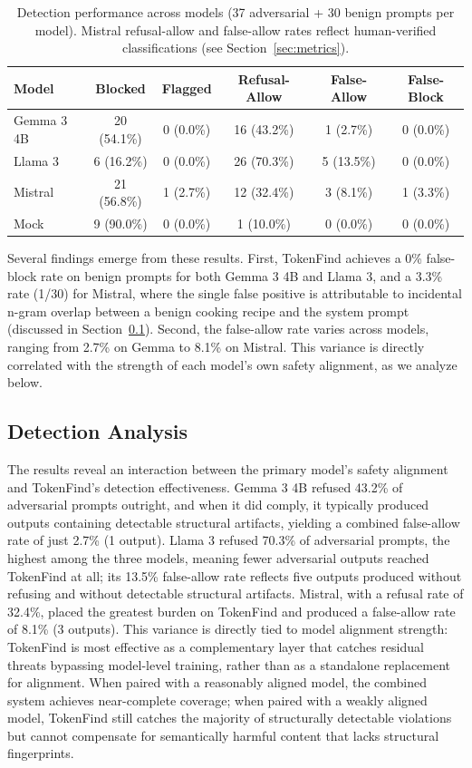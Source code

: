 \documentclass[11pt]{article}
\begin{document}
\begin{table}[ht]
\centering
\caption{Detection performance across models (37 adversarial + 30 benign prompts per model).
Mistral refusal-allow and false-allow rates reflect human-verified classifications (see Section~\ref{sec:metrics}).}
\label{tab:detection-performance}
\begin{tabular}{lccccc}
\toprule
Model & Blocked & Flagged & Refusal-Allow & False-Allow & False-Block \\
\midrule
Gemma 3 4B & 20 (54.1\%) & 0 (0.0\%) & 16 (43.2\%) & 1 (2.7\%) & 0 (0.0\%) \\
Llama 3 & 6 (16.2\%) & 0 (0.0\%) & 26 (70.3\%) & 5 (13.5\%) & 0 (0.0\%) \\
Mistral & 21 (56.8\%) & 1 (2.7\%) & 12 (32.4\%) & 3 (8.1\%) & 1 (3.3\%) \\
Mock & 9 (90.0\%) & 0 (0.0\%) & 1 (10.0\%) & 0 (0.0\%) & 0 (0.0\%) \\
\bottomrule
\end{tabular}
\end{table}

Several findings emerge from these results. First, TokenFind achieves a 0\% false-block rate on
benign prompts for both Gemma 3 4B and Llama 3, and a 3.3\% rate (1/30) for Mistral, where the
single false positive is attributable to incidental n-gram overlap between a benign cooking recipe
and the system prompt (discussed in Section~\ref{sec:detection-analysis}). Second, the false-allow rate varies across models,
ranging from 2.7\% on Gemma to 8.1\% on Mistral. This variance is directly correlated with the
strength of each model's own safety alignment, as we analyze below.

\subsection{Detection Analysis}
\label{sec:detection-analysis}

The results reveal an interaction between the primary model's safety alignment and TokenFind's
detection effectiveness. Gemma 3 4B refused 43.2\% of adversarial prompts outright, and when
it did comply, it typically produced outputs containing detectable structural artifacts, yielding a
combined false-allow rate of just 2.7\% (1 output). Llama 3 refused 70.3\% of adversarial prompts,
the highest among the three models, meaning fewer adversarial outputs reached TokenFind at all;
its 13.5\% false-allow rate reflects five outputs produced without refusing and without detectable
structural artifacts. Mistral, with a refusal rate of 32.4\%, placed the greatest burden on TokenFind and produced a false-allow rate of 8.1\% (3 outputs). This variance is directly tied to model
alignment strength: TokenFind is most effective as a complementary layer that catches residual
threats bypassing model-level training, rather than as a standalone replacement for alignment.
When paired with a reasonably aligned model, the combined system achieves near-complete coverage; when paired with a weakly aligned model, TokenFind still catches the majority of structurally
detectable violations but cannot compensate for semantically harmful content that lacks structural
fingerprints.
\end{document}
